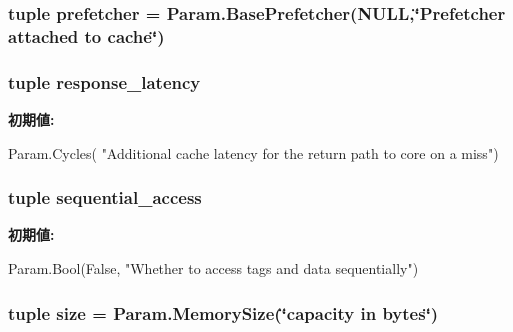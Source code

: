 \hypertarget{classBaseCache_1_1BaseCache_a7fc8a097fde225fa0218465029ad22d5}{
\subsubsection[{prefetcher}]{\setlength{\rightskip}{0pt plus 5cm}tuple {\bf prefetcher} = Param.BasePrefetcher(NULL,\char`\"{}Prefetcher attached to cache\char`\"{})}}
\label{classBaseCache_1_1BaseCache_a7fc8a097fde225fa0218465029ad22d5}
\hypertarget{classBaseCache_1_1BaseCache_a429316ef45dd1f50afd6893d69df14ff}{
\subsubsection[{response\_\-latency}]{\setlength{\rightskip}{0pt plus 5cm}tuple {\bf response\_\-latency}}}
\label{classBaseCache_1_1BaseCache_a429316ef45dd1f50afd6893d69df14ff}
{\bfseries 初期値:}
\begin{DoxyCode}
Param.Cycles(
            "Additional cache latency for the return path to core on a miss")
\end{DoxyCode}
\hypertarget{classBaseCache_1_1BaseCache_a0545f3dc4d67873176d4d70d4618e078}{
\subsubsection[{sequential\_\-access}]{\setlength{\rightskip}{0pt plus 5cm}tuple {\bf sequential\_\-access}}}
\label{classBaseCache_1_1BaseCache_a0545f3dc4d67873176d4d70d4618e078}
{\bfseries 初期値:}
\begin{DoxyCode}
Param.Bool(False,
        "Whether to access tags and data sequentially")
\end{DoxyCode}
\hypertarget{classBaseCache_1_1BaseCache_a377e5da8df1f89c5468c8b8cd07eac89}{
\subsubsection[{size}]{\setlength{\rightskip}{0pt plus 5cm}tuple {\bf size} = Param.MemorySize(\char`\"{}capacity in bytes\char`\"{})}}
